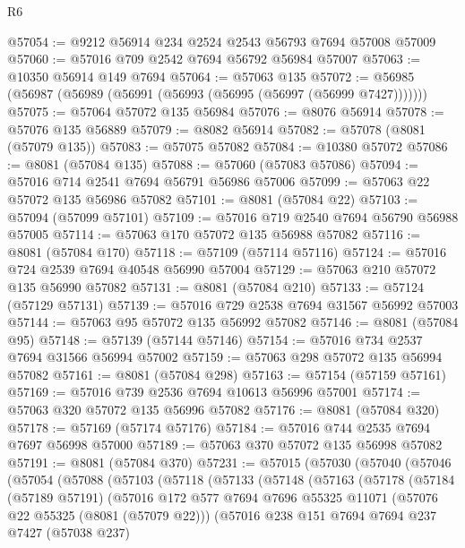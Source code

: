 \begin{lexlean}{R6}
\begin{coremodule}
@57054 := @9212 @56914 @234 @2524 @2543 @56793 @7694 @57008 @57009
@57060 := @57016 @709 @2542 @7694 @56792 @56984 @57007
@57063 := @10350 @56914 @149 @7694
@57064 := @57063 @135
@57072 := @56985 (@56987 (@56989 (@56991 (@56993 (@56995 (@56997 (@56999 @7427)))))))
@57075 := @57064 @57072 @135 @56984
@57076 := @8076 @56914
@57078 := @57076 @135 @56889
@57079 := @8082 @56914
@57082 := @57078 (@8081 (@57079 @135))
@57083 := @57075 @57082
@57084 := @10380 @57072
@57086 := @8081 (@57084 @135)
@57088 := @57060 (@57083 @57086)
@57094 := @57016 @714 @2541 @7694 @56791 @56986 @57006
@57099 := @57063 @22 @57072 @135 @56986 @57082
@57101 := @8081 (@57084 @22)
@57103 := @57094 (@57099 @57101)
@57109 := @57016 @719 @2540 @7694 @56790 @56988 @57005
@57114 := @57063 @170 @57072 @135 @56988 @57082
@57116 := @8081 (@57084 @170)
@57118 := @57109 (@57114 @57116)
@57124 := @57016 @724 @2539 @7694 @40548 @56990 @57004
@57129 := @57063 @210 @57072 @135 @56990 @57082
@57131 := @8081 (@57084 @210)
@57133 := @57124 (@57129 @57131)
@57139 := @57016 @729 @2538 @7694 @31567 @56992 @57003
@57144 := @57063 @95 @57072 @135 @56992 @57082
@57146 := @8081 (@57084 @95)
@57148 := @57139 (@57144 @57146)
@57154 := @57016 @734 @2537 @7694 @31566 @56994 @57002
@57159 := @57063 @298 @57072 @135 @56994 @57082
@57161 := @8081 (@57084 @298)
@57163 := @57154 (@57159 @57161)
@57169 := @57016 @739 @2536 @7694 @10613 @56996 @57001
@57174 := @57063 @320 @57072 @135 @56996 @57082
@57176 := @8081 (@57084 @320)
@57178 := @57169 (@57174 @57176)
@57184 := @57016 @744 @2535 @7694 @7697 @56998 @57000
@57189 := @57063 @370 @57072 @135 @56998 @57082
@57191 := @8081 (@57084 @370)
@57231 := @57015
    (@57030
      (@57040
        (@57046
          (@57054
            (@57088
              (@57103
                (@57118
                  (@57133
                    (@57148
                      (@57163
                        (@57178
                          (@57184
                            (@57189 @57191)
                            (@57016
                              @172
                              @577
                              @7694
                              @7696
                              @55325
                              @11071
                              (@57076 @22 @55325 (@8081 (@57079 @22)))
                              (@57016
                                @238
                                @151
                                @7694
                                @7694
                                @237
                                @7427
                                (@57038 @237)

\end{coremodule}
\end{lexlean}
